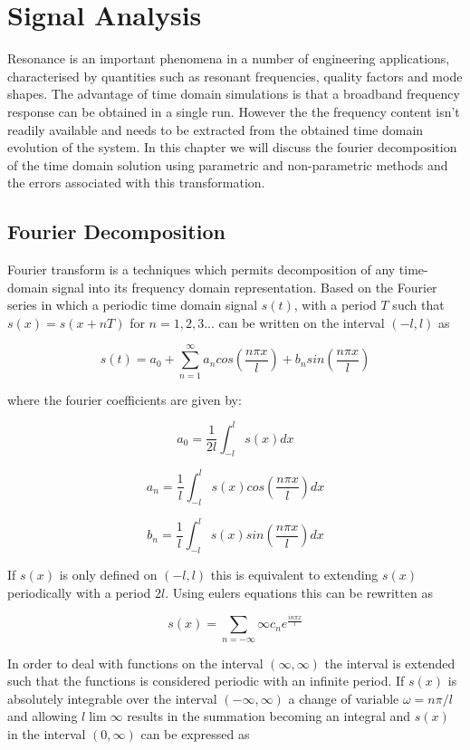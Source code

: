 \chapter{Signal Analysis}
\label{Chapter2}

Resonance is an important phenomena in a number of engineering applications, characterised by quantities such as resonant frequencies, quality factors and mode shapes. The advantage of time domain simulations is that a broadband frequency response can be obtained in a single run. However the the frequency content isn't readily available and needs to be extracted from the obtained time domain evolution of the system. In this chapter we will discuss the fourier decomposition of the time domain solution using parametric and non-parametric methods and the errors associated with this transformation.

\section{Fourier Decomposition}

Fourier transform is a techniques which permits decomposition of any time-domain signal into its frequency domain representation. Based on the Fourier series in which a periodic time domain signal $s(t)$, with a period $T$ such that $s(x)=s(x+nT)$ for $n=1,2,3 ...$ can be written on the interval $(-l,l)$ as

$$
s(t) = a_0 + \sum_{n=1}^{\infty} a_n cos(\frac{n\pi x}{l}) + b_n sin(\frac{n\pi x}{l})
$$

where the fourier coefficients are given by:

$$
a_0 = \frac{1}{2l}\int_{-l}^{l} s(x) dx
$$

$$
a_n = \frac{1}{l}\int_{-l}^{l} s(x) cos(\frac{n \pi x}{l}) dx
$$

$$
b_n = \frac{1}{l}\int_{-l}^{l} s(x) sin(\frac{n \pi x}{l}) dx
$$

If $s(x)$ is only defined on $(-l,l)$ this is equivalent to extending $s(x)$ periodically with a period $2l$. Using eulers equations this can be rewritten as

$$
s(x) = \sum_{n=-\infty}{\infty} c_n e^{\frac{i n \pi x}{l}}
$$

In order to deal with functions on the interval $(\infty,\infty)$ the interval is extended such that the functions is considered periodic with an infinite period. If $s(x)$ is absolutely integrable over the interval $(-\infty,\infty)$ a change of variable $\omega = n \pi / l$ and allowing $l \lim \infty$ results in the summation becoming an integral and $s(x)$ in the interval $(0,\infty)$ can be expressed as

